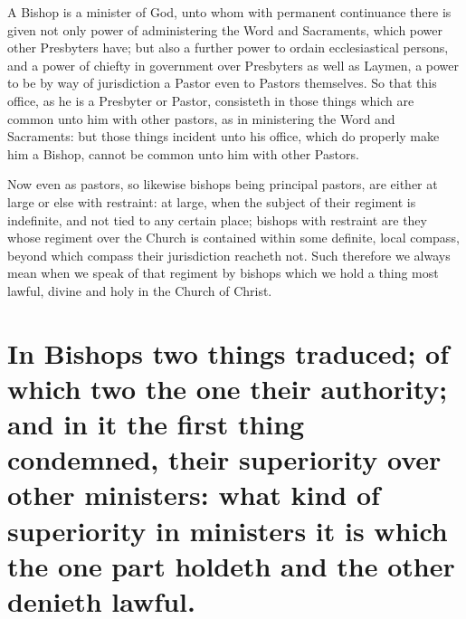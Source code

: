 A Bishop is a minister of God, unto whom with permanent continuance there is given not only power of administering the Word and Sacraments, which power other Presbyters have; but also a further power to ordain ecclesiastical persons, and a power of chiefty in government over Presbyters as well as Laymen, a power to be by way of jurisdiction a Pastor even to Pastors themselves. So that this office, as he is a Presbyter or Pastor, consisteth in those things which are common unto him with other pastors, as in ministering the Word and Sacraments: but those things incident unto his office, which do properly make him a Bishop, cannot be common unto him with other Pastors.

Now even as pastors, so likewise bishops being principal pastors, are either at large or else with restraint: at large, when the subject of their regiment is indefinite, and not tied  to any certain place;
 bishops with restraint are they whose regiment over the Church is contained within some definite, local compass, beyond which compass their jurisdiction reacheth not. Such therefore we always mean when we speak of that regiment by bishops which we hold a thing most lawful, divine and holy in the Church of Christ.

\section*{In Bishops two things traduced; of which two the one their authority; and in it the first thing condemned, their superiority over other ministers: what kind of superiority in ministers it is which the one part holdeth and the other denieth lawful.}

